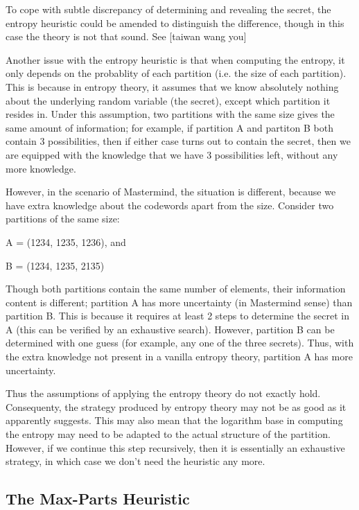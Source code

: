 To cope with subtle discrepancy of determining and revealing the secret, the entropy heuristic could be amended to distinguish the difference, though in this case the theory is not that sound. See [taiwan wang you]

Another issue with the entropy heuristic is that when computing the entropy, it only depends on the probablity of each partition (i.e. the size of each partition). This is because in entropy theory, it assumes that we know absolutely nothing about the underlying random variable (the secret), except which partition it resides in. Under this assumption, two partitions with the same size gives the same amount of information; for example, if partition A and partiton B both contain 3 possibilities, then if either case turns out to contain the secret, then we are equipped with the knowledge that we have 3 possibilities left, without any more knowledge.

However, in the scenario of Mastermind, the situation is different, because we have extra knowledge about the codewords apart from the size. Consider two partitions of the same size:

A = (1234, 1235, 1236), and

B = (1234, 1235, 2135)

Though both partitions contain the same number of elements, their information content is different; partition A has more uncertainty (in Mastermind sense) than partition B. This is because it requires at least 2 steps to determine the secret in A (this can be verified by an exhaustive search). However, partition B can be determined with one guess (for example, any one of the three secrets). Thus, with the extra knowledge not present in a vanilla entropy theory, partition A has more uncertainty.

Thus the assumptions of applying the entropy theory do not exactly hold. Consequenty, the strategy produced by entropy theory may not be as good as it apparently suggests. This may also mean that the logarithm base in computing the entropy may need to be adapted to the actual structure of the partition. However, if we continue this step recursively, then it is essentially an exhaustive strategy, in which case we don't need the heuristic any more.



\subsection{The Max-Parts Heuristic}

